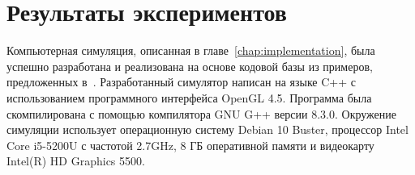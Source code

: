 \chapter{Результаты экспериментов}

Компьютерная симуляция, описанная в главе~\ref{chap:implementation}, была
успешно разработана и реализована на основе кодовой базы из примеров,
предложенных в~\cite{LearnOGL}. Разработанный симулятор написан на языке C++ с
использованием программного интерфейса OpenGL 4.5. Программа была скомпилирована
с помощью компилятора GNU G++ версии 8.3.0. Окружение симуляции использует
операционную систему Debian 10 Buster, процессор Intel Core i5-5200U с частотой
2.7GHz, 8 ГБ оперативной памяти и видеокарту Intel(R) HD Graphics 5500.
